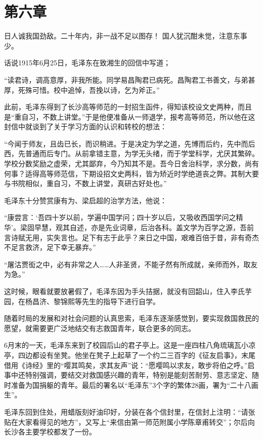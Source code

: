 \documentclass[../../dazhuan.tex]{subfiles}
\begin{document}
\chapter*{第六章}
\begin{pref}
	日人诚我国劲敌。二十年内，非一战不足以图存！	
国人犹沉酣未觉，注意东事少。
\end{pref}

话说1915年6月25日，毛泽东在致湘生的回信中写道；

“读君诗，调高意厚，非我所能。同学易昌陶君已病死。昌陶君工书善文，与弟甚厚，死殊可惜。校中追悼，吾挽以诗，乞为斧正。”

此前，毛泽东得到了长沙高等师范的一封招生函件，得知该校设文史两种，而且是“重自习，不数上讲堂。”于是他便准备从一师退学，报考高等师范，所以他在这封信中就谈到了关于学习方面的认识和转校的想法：

“今闻于师友，且齿已长，而识稍进。于是决定为学之道，先博而后约，先中而后西，先普通而后专门。从前拿错主意，为学无头绪，而于学堂科学，尤厌其繁碎。学校分数奖励之虚荣，尤其鄙弃，今乃知其不是。吾今日舍治科学，求分数，尚有何事？适得高等师范信，下期设招文史两科，皆为矫近时学绝道丧之弊。其制大要与书院相似，重自习，不数上讲堂，真研古好处也。”

毛泽东十分赞赏康有为、梁启超的治学方法，他说：

“康尝言：‘吾四十岁以前，学遍中国学问；四十岁以后，又吸收西国学问之精华’。梁固早慧，观其自述，亦是先业词章，后治各科。盖文学为百学之源，吾前言诗赋无用，实失言也。足下有志于此乎？来日之中国，艰难百倍于昔，非有奇杰不足言救济，足下幸无暴弃。”

“屠沽贾衒之中，必有非常之人……人非圣贤，不能孑然有所成就，亲师而外，取友为急。”

这时候，眼看就要放暑假了，毛泽东因为手头拮据，就没有回韶山，住入李氏芋园，在杨昌济、黎锦熙等先生的指导下进行自学。

随着时局的发展和对社会问题的认真思索，毛泽东逐渐感觉到，要实现救国救民的愿望，就需要更广泛地结交有志救国青年，联合更多的同志。

6月末的一天，毛泽东来到了校园后山的君子亭上。这是一座四柱八角琉璃瓦小凉亭，四边都设有坐凳。他坐在凳子上起草了一个约二三百字的《征友启事》，末尾借用《诗经》里的“嘤其鸣矣，求其友声”说：“愿嘤鸣以求友，敢步将伯之呼。”启事中还特别强调，要结交对救国感兴趣的青年，特别是能刻苦耐劳、意志坚定、随时准备为国捐躯的青年。最后的署名以“毛泽东”3个字的繁体28画，署为“二十八画生”。

毛泽东回到住处，用蜡版刻好油印好，分装在各个信封里，在信封上注明：“请张贴在大家看得见的地方”，又写上“来信由第一师范附属小学陈章甫转交”；尔后向长沙各主要学校都发了一份。
\end{document}
